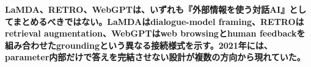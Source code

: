 \noindent\textbf{LaMDA、RETRO、WebGPTは、いずれも『外部情報を使う対話AI』としてまとめるべきではない。LaMDAはdialogue-model framing、RETROはretrieval augmentation、WebGPTはweb browsingとhuman feedbackを組み合わせたgroundingという異なる接続様式を示す。2021年には、parameter内部だけで答えを完結させない設計が複数の方向から現れていた。}\autocite{src-66643bb115ae,src-6ab2302937b2,src-72eada5e8850,src-a3971b3f646f,src-bb1464aabad9}
